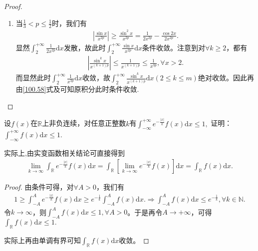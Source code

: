 \documentclass[../../main.tex]{subfiles}
\begin{document}
\begin{proof}
\begin{enumerate}
\begin{enumerate}
\item 当\(\frac{1}{3}<p\leqslant \frac{1}{2}\)时，我们有
\begin{align*}
\left|\frac{\sin x}{x^{2p}}\right|\geqslant\frac{\sin^2 x}{x^{2p}}=\frac{1}{2x^{2p}}-\frac{\cos 2x}{2x^{2p}}.
\end{align*}
显然\(\int_{2}^{+\infty}\frac{1}{2x^{2p}}\mathrm{d}x\)发散，故此时\(\int_{2}^{+\infty}\frac{\sin x}{x^{2p}}\mathrm{d}x\)条件收敛。注意到对\(\forall k\geqslant 2\)，都有
\begin{align*}
\left|\frac{\sin^k x}{x^{(k + 1)p}}\right|\leqslant\frac{1}{x^{(k + 1)p}}\leqslant\frac{1}{x^{3p}},\forall x > 2.
\end{align*}
而显然此时\(\int_{2}^{+\infty}\frac{1}{x^{3p}}\mathrm{d}x\)收敛，故\(\int_{2}^{+\infty}\frac{\sin^k x}{x^{(k + 1)p}}\mathrm{d}x(2\leqslant  k\leqslant  m)\)绝对收敛。因此再由\eqref{100.58}式及可知原积分此时条件收敛.
\end{enumerate} 
\end{enumerate}

\end{proof}

\begin{example}
设\(f(x)\)在\(\mathbb{R}\)上非负连续，对任意正整数\(k\)有$\int_{-\infty}^{+\infty} e^{-\frac{|x|}{k}}f(x)\mathrm{d}x \leqslant  1,$
证明：$\int_{-\infty}^{+\infty}f(x)\mathrm{d}x \leqslant  1.$
\end{example}
\begin{remark}
实际上,由实变函数相关结论可直接得到
\begin{align*}
\lim_{k\rightarrow \infty}\int_{\mathbb{R}}e^{-\frac{| x |}{k}}f( x ) \mathrm{d}x=\int_{\mathbb{R}}\left[ \lim_{k\rightarrow \infty}e^{-\frac{| x |}{k}}f( x ) \right] \mathrm{d}x=\int_{\mathbb{R}}f( x ) \mathrm{d}x.
\end{align*}
\end{remark}
\begin{proof}
由条件可得，对$\forall A>0$，我们有
\begin{align*}
1\geqslant \int_{-A}^Ae^{-\frac{| x |}{k}}f( x ) \mathrm{d}x\geqslant e^{-\frac{1}{k}}\int_{-A}^Af( x ) \mathrm{d}x.\Rightarrow \int_{-A}^Af( x ) \mathrm{d}x\leqslant e^{-\frac{1}{k}},\forall k\in \mathbb{N} .
\end{align*}
令$k\rightarrow \infty$，则$\int_{-A}^Af( x ) \mathrm{d}x\leqslant 1,\forall A>0$。于是再令$A\rightarrow +\infty$，可得$\int_{\mathbb{R}}f( x ) \mathrm{d}x\leqslant 1.$

实际上再由单调有界可知$\int_{\mathbb{R}}f( x ) \mathrm{d}x$收敛。

\end{proof}
\end{document}
